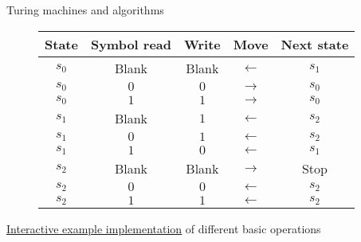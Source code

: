\documentclass[11pt,compress,t,notes=noshow, xcolor=table]{beamer}
\begin{document}
\begin{vbframe}{Turing machines and algorithms}
\begin{figure}[widht=0.6\textwidth]

  \begin{footnotesize}
  \begin{tabular}{|c|c|c|c|c|}
    \hline
    \textbf{State} & \textbf{Symbol read} & \textbf{Write} & \textbf{Move} & \textbf{Next state} \\
    \hline
    $s_0$ & Blank & Blank & $\leftarrow$ & $s_1$ \\
    $s_0$ & $0$ & $0$ & $\rightarrow$ & $s_0$ \\
    $s_0$ & $1$ & $1$ &  $\rightarrow$ & $s_0$ \\
    \hline
    $s_1$ & Blank & $1$ & $\leftarrow$ & $s_2$ \\
    $s_1$ & $0$ & $1$ & $\leftarrow$ & $s_2$ \\
    $s_1$ & $1$ & $0$ &  $\leftarrow$ & $s_1$ \\
    \hline
    $s_2$ & Blank & Blank & $\rightarrow$ & Stop \\
    $s_2$ & $0$ & $0$ & $\leftarrow$ & $s_2$ \\
    $s_2$ & $1$ & $1$ &  $\leftarrow$ & $s_2$ \\
    \hline
  \end{tabular}
  \end{footnotesize}
\end{figure}

\begin{footnotesize}
\href{http://turingmaschine.klickagent.ch/einband}{\color{blue}\underline{Interactive example implementation}} of different basic operations
\end{footnotesize}

\framebreak

\begin{figure}[width=0.6\textwidth]
\end{figure}
\end{vbframe}
\end{document}
